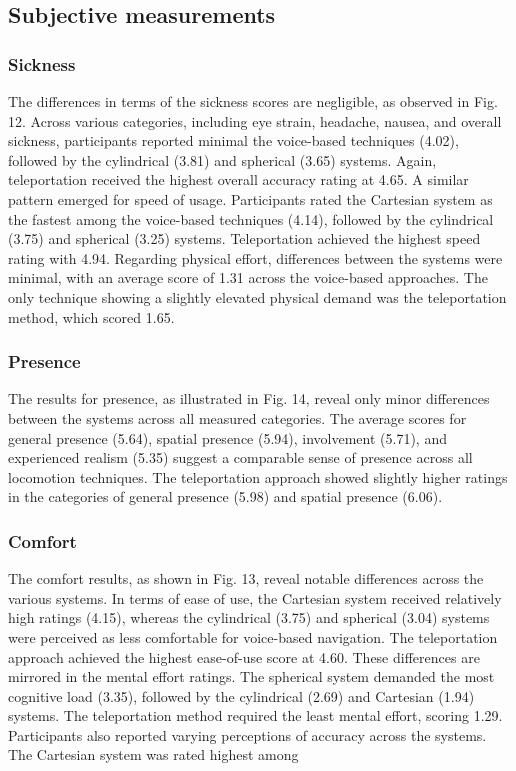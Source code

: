 \documentclass[preprint,12pt]{elsarticle}
\newcommand{\reftext}[1]{{\color{gray}#1}}   %
\begin{document}
\subsection{Subjective measurements}
\subsubsection{Sickness}
\reftext{The differences in terms of the sickness scores are negligible, as observed in Fig. 12. Across various categories, including eye strain, headache, nausea, and overall sickness, participants reported minimal the voice-based techniques (4.02), followed by the cylindrical (3.81) and spherical (3.65) systems. Again, teleportation received the highest overall accuracy rating at 4.65. A similar pattern emerged for speed of usage. Participants rated the Cartesian system as the fastest among the voice-based techniques (4.14), followed by the cylindrical (3.75) and spherical (3.25) systems. Teleportation achieved the highest speed rating with 4.94. Regarding physical effort, differences between the systems were minimal, with an average score of 1.31 across the voice-based approaches. The only technique showing a slightly elevated physical demand was the teleportation method, which scored 1.65.}

\subsubsection{Presence}
\reftext{The results for presence, as illustrated in Fig. 14, reveal only minor differences between the systems across all measured categories. The average scores for general presence (5.64), spatial presence (5.94), involvement (5.71), and experienced realism (5.35) suggest a comparable sense of presence across all locomotion techniques. The teleportation approach showed slightly higher ratings in the categories of general presence (5.98) and spatial presence (6.06).}

\subsubsection{Comfort}
\reftext{The comfort results, as shown in Fig. 13, reveal notable differences across the various systems. In terms of ease of use, the Cartesian system received relatively high ratings (4.15), whereas the cylindrical (3.75) and spherical (3.04) systems were perceived as less comfortable for voice-based navigation. The teleportation approach achieved the highest ease-of-use score at 4.60. These differences are mirrored in the mental effort ratings. The spherical system demanded the most cognitive load (3.35), followed by the cylindrical (2.69) and Cartesian (1.94) systems. The teleportation method required the least mental effort, scoring 1.29. Participants also reported varying perceptions of accuracy across the systems. The Cartesian system was rated highest among}
\end{document}
